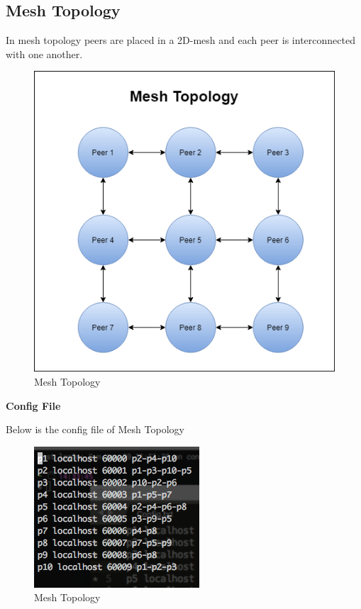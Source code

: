 \documentclass{article}
\begin{document}
\subsection{Mesh Topology}
In mesh topology peers are placed in a 2D-mesh and  each peer is interconnected with one another.
\begin{figure} [H]
\centering
        \includegraphics[totalheight=8cm]{MeshArch.png}
    \caption{Mesh Topology}
    \label{fig:verticalcell}
\end{figure}

\textbf{Config File}

Below is the config file of Mesh Topology
\begin{figure} [H]
\centering
        \includegraphics[totalheight=8cm]{Mesh.png}
    \caption{Mesh Topology}
    \label{fig:verticalcell}
\end{figure}
\end{document}
